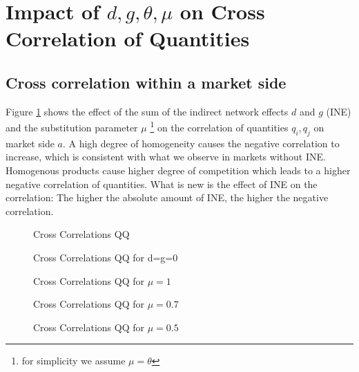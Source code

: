 \documentclass[10pt,a4paper]{article}
\begin{document}
\section{Impact of $d, g, \theta, \mu$ on Cross Correlation of Quantities}

\subsection{Cross correlation within a market side}

Figure \ref{QQ} shows the effect of the sum of the indirect network effects $d$ and $g$ (INE) and the substitution parameter $\mu$ \footnote{for simplicity we assume $\mu=\theta$ } on the correlation of quantities $q_i,q_j$ on market side $a$.  A high degree of homogeneity causes the negative correlation to increase, which is consistent with what we observe in markets without INE. Homogenous products cause higher degree of competition which leads to a higher negative correlation of quantities. What is new is the effect of INE on the correlation: The higher the absolute amount of INE, the higher the negative correlation. 

\begin{figure}[H]
	\centering
	\newlength\figureheight 
	\newlength\figurewidth 
	\setlength\figureheight{8cm} 
	\setlength\figurewidth{10cm}
	
	\caption{Cross Correlations QQ}
	\label{QQ}
\end{figure}

\begin{figure}[H]
	\centering
	\setlength\figureheight{8cm} 
	\setlength\figurewidth{8cm}
	
	\caption{Cross Correlations QQ for d=g=0}
	\label{QQ2}
\end{figure}

\begin{figure}[H]
	\centering
	\setlength\figureheight{8cm} 
	\setlength\figurewidth{8cm}
	
	\caption{Cross Correlations QQ for $\mu=1$}
	\label{QQ2}
\end{figure}

\begin{figure}[H]
	\centering
	\setlength\figureheight{8cm} 
	\setlength\figurewidth{8cm}
	
	\caption{Cross Correlations QQ for $\mu=0.7$}
	\label{QQ2}
\end{figure}

\begin{figure}[H]
	\centering
	\setlength\figureheight{8cm} 
	\setlength\figurewidth{8cm}
	
	\caption{Cross Correlations QQ for $\mu=0.5$}
	\label{QQ2}
\end{figure}
\end{document}
